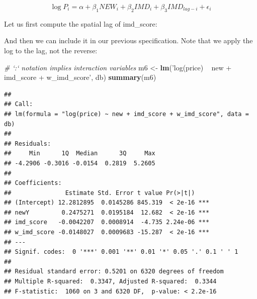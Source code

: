 \documentclass[]{book}
\newenvironment{Shaded}{\begin{snugshade}}{\end{snugshade}}
\newcommand{\KeywordTok}[1]{\textcolor[rgb]{0.13,0.29,0.53}{\textbf{#1}}}
\newcommand{\StringTok}[1]{\textcolor[rgb]{0.31,0.60,0.02}{#1}}
\newcommand{\CommentTok}[1]{\textcolor[rgb]{0.56,0.35,0.01}{\textit{#1}}}
\newcommand{\OperatorTok}[1]{\textcolor[rgb]{0.81,0.36,0.00}{\textbf{#1}}}
\newcommand{\NormalTok}[1]{#1}
\begin{document}
\[
\log{P_i} = \alpha + \beta_{1} NEW_i + \beta_{2} IMD_i + \beta_{3} IMD_{lag-i} + \epsilon_i
\]

Let us first compute the spatial lag of imd\_score:

\begin{Shaded}
\end{Shaded}

And then we can include it in our previous specification. Note that we
apply the log to the lag, not the reverse:

\begin{Shaded}
\begin{Highlighting}[]
\CommentTok{# `:` notation implies interaction variables}
\NormalTok{m6 <-}\StringTok{ }\KeywordTok{lm}\NormalTok{(}\StringTok{'log(price) ~ new + imd_score + w_imd_score'}\NormalTok{, db)}
\KeywordTok{summary}\NormalTok{(m6)}
\end{Highlighting}
\end{Shaded}

\begin{verbatim}
## 
## Call:
## lm(formula = "log(price) ~ new + imd_score + w_imd_score", data = db)
## 
## Residuals:
##     Min      1Q  Median      3Q     Max 
## -4.2906 -0.3016 -0.0154  0.2819  5.2605 
## 
## Coefficients:
##               Estimate Std. Error t value Pr(>|t|)    
## (Intercept) 12.2812895  0.0145286 845.319  < 2e-16 ***
## newY         0.2475271  0.0195184  12.682  < 2e-16 ***
## imd_score   -0.0042207  0.0008914  -4.735 2.24e-06 ***
## w_imd_score -0.0148027  0.0009683 -15.287  < 2e-16 ***
## ---
## Signif. codes:  0 '***' 0.001 '**' 0.01 '*' 0.05 '.' 0.1 ' ' 1
## 
## Residual standard error: 0.5201 on 6320 degrees of freedom
## Multiple R-squared:  0.3347, Adjusted R-squared:  0.3344 
## F-statistic:  1060 on 3 and 6320 DF,  p-value: < 2.2e-16
\end{verbatim}
\end{document}
